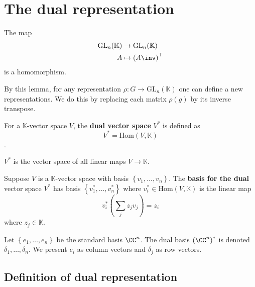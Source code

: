 \documentclass[12pt, a4paper]{article}
\newcommand{\gl}{\text{GL}}
\newcommand{\KK}{\mathbb{K}}
\begin{document}
\section{The dual representation}

\begin{lemma}
    The map 
    \[\begin{aligned}
        \gl_n(\KK) &\to \gl_n(\KK) \\
        A &\mapsto \left( A\inv \right)^{\top}
    \end{aligned}\]
    is a homomorphism.
\end{lemma}

\begin{mdnote}
    By this lemma, for any representation \(\rho:G \to \gl_n(\KK)\) one can define a new representations. We do this by replacing each matrix \(\rho(g)\) by its inverse transpose.
\end{mdnote}

\begin{definition}
    For a \(\KK\)-vector space \(V\), the \textbf{dual vector space} \(V^*\) is defined as 
    \[V^* = \text{Hom}(V,\KK)\].
\end{definition}

\begin{mdremark}
    \(V^*\) is the vector space of all linear maps \(V \to \KK\).
\end{mdremark}

\begin{definition}
    Suppose \(V\) is a \(\KK\)-vector space with basis \(\left\{ v_1,\ldots,v_n \right\}\). The \textbf{basis for the dual} vector space \(V^*\) has basis \(\left\{ v_1^*,\ldots,v_n^* \right\}\) where \(v_i^* \in \text{Hom}(V,\KK)\) is the linear map 
    \[v_i^*\left( \sum_j z_j v_j \right) = z_i\]
    where \(z_j \in \KK\). 
\end{definition}

\begin{mdexample}
    Let \(\left\{ e_1,\ldots,e_n \right\}\) be the standard basis \(\CC^n\). The dual basis \(\left( \CC^n \right)^*\) is denoted \(\delta_1,\ldots,\delta_n\). We present \(e_i\) as column vectors and \(\delta_j\) as row vectors.
\end{mdexample}

\subsection{Definition of dual representation}
\end{document}
